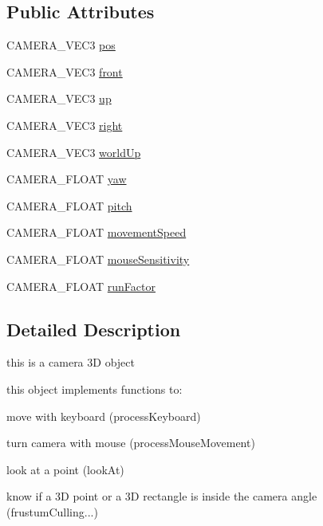 \subsection*{Public Attributes}
\begin{DoxyCompactItemize}
\item 
C\+A\+M\+E\+R\+A\+\_\+\+V\+E\+C3 \hyperlink{class_camera_a645cd9343d8c0160ce2281111240f9fd}{pos}
\item 
C\+A\+M\+E\+R\+A\+\_\+\+V\+E\+C3 \hyperlink{class_camera_ab4e78bcb515de19fbac48e3079dd7ccc}{front}
\item 
C\+A\+M\+E\+R\+A\+\_\+\+V\+E\+C3 \hyperlink{class_camera_a02d03a426815c0d64522724fbe2374ca}{up}
\item 
C\+A\+M\+E\+R\+A\+\_\+\+V\+E\+C3 \hyperlink{class_camera_aa242be0f8ab49b72ec65fcdcec807bb5}{right}
\item 
C\+A\+M\+E\+R\+A\+\_\+\+V\+E\+C3 \hyperlink{class_camera_a9088ff173e443938f31ed4b6c0f75756}{world\+Up}
\item 
C\+A\+M\+E\+R\+A\+\_\+\+F\+L\+O\+AT \hyperlink{class_camera_aa11a0643425580b4115bb9b839542891}{yaw}
\item 
C\+A\+M\+E\+R\+A\+\_\+\+F\+L\+O\+AT \hyperlink{class_camera_aaaff48d7638a7e3cc7e141f11cc23293}{pitch}
\item 
C\+A\+M\+E\+R\+A\+\_\+\+F\+L\+O\+AT \hyperlink{class_camera_a2e09cc969e7e7733051df9a0bfe9afa0}{movement\+Speed}
\item 
C\+A\+M\+E\+R\+A\+\_\+\+F\+L\+O\+AT \hyperlink{class_camera_a0fd9adbe4484147947bc1f51452edd6f}{mouse\+Sensitivity}
\item 
C\+A\+M\+E\+R\+A\+\_\+\+F\+L\+O\+AT \hyperlink{class_camera_a891d353a14161c6be625f6a52b75375d}{run\+Factor}
\end{DoxyCompactItemize}


\subsection{Detailed Description}
this is a camera 3D object 

this object implements functions to\+:
\begin{DoxyItemize}
\item move with keyboard (process\+Keyboard)
\item turn camera with mouse (process\+Mouse\+Movement)
\item look at a point (look\+At)
\item know if a 3D point or a 3D rectangle is inside the camera angle (frustum\+Culling...) 
\end{DoxyItemize}

